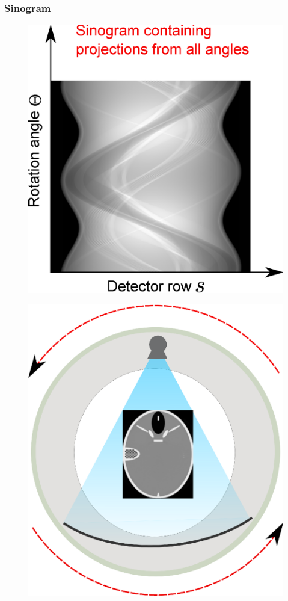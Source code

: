 \begin{frame}
    \frametitle{Sinogram}
    \begin{minipage}{0.52\textwidth}
        \begin{figure}
            \centering{}
            \includegraphics[scale=.30]{images/sinogram.eps}
        \end{figure}
    \end{minipage}
    \begin{minipage}{0.45\textwidth}
        \begin{figure}
            \centering{}
            \includegraphics[scale=.35]{images/multict2.eps}

\end{figure}
\end{minipage}
\end{frame}
